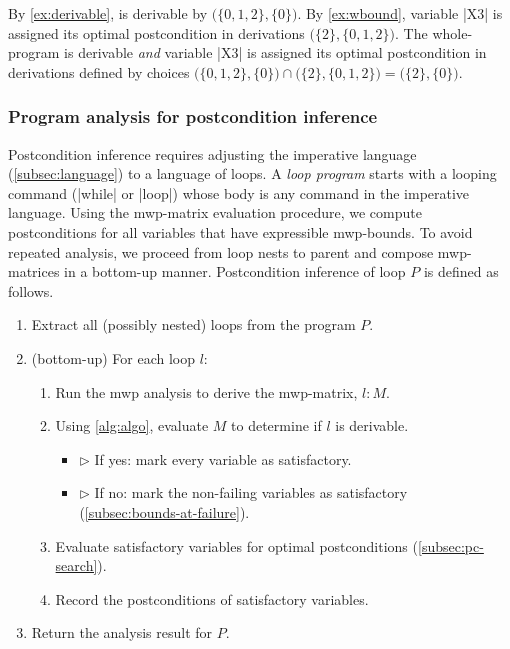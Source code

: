 \begin{example}\label{ex:opt-derivation}
By \autoref{ex:derivable}, \exname is derivable by  \(\big(\{0, 1, 2\}, \{0\}\big)\).
By \autoref{ex:wbound}, variable \pr|X3| is assigned its optimal postcondition in derivations \(\big(\{2\}, \{0,1,2\}\big)\).
The whole-program is derivable \emph{and} variable \pr|X3| is assigned its optimal postcondition in derivations defined by choices
\( \big(\{0, 1, 2\}, \{0\}\big) \cap \big(\{2\}, \{0,1,2\}\big) = \big( \{2\}, \{0\}\big) \).
\end{example}

\subsubsection{Program analysis for postcondition inference}
\label{subsec:inference}

Postcondition inference requires adjusting the imperative language (\autoref{subsec:language}) to a language of loops.
A \emph{loop program} starts with a looping command (\pr|while| or \pr|loop|) whose body is any command in the imperative language.
Using the mwp-matrix evaluation procedure, we compute postconditions for all variables that have expressible mwp-bounds.
To avoid repeated analysis, we proceed from loop nests to parent and compose mwp-matrices in a bottom-up manner. %
Postcondition inference of loop \(P\) is defined as follows.

\begin{enumerate}
    \item Extract all (possibly nested) loops from the program \(P\).
    \item (bottom-up) For each loop \(l\):
    \begin{enumerate}[label=(\roman*)]
    \item Run the mwp analysis to derive the mwp-matrix, \(l : M\).
    \item Using \autoref{alg:algo}, evaluate \(M\) to determine if \(l\) is derivable.
    \begin{itemize}
        \item[] \(\triangleright\) If yes: mark every variable as satisfactory.
        \item[] \(\triangleright\) If no: mark the non-failing variables as satisfactory (\autoref{subsec:bounds-at-failure}).
    \end{itemize}
    \item Evaluate satisfactory variables for optimal postconditions (\autoref{subsec:pc-search}).
    \item Record the postconditions of satisfactory variables.
    \end{enumerate}
    \item Return the analysis result for \(P\).
\end{enumerate}

